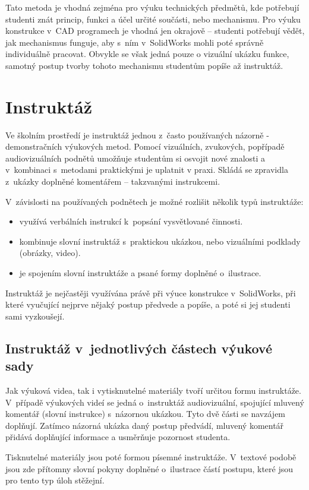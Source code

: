 Tato metoda je vhodná zejména pro výuku technických předmětů, kde potřebují studenti znát princip, funkci a účel určité součásti, nebo mechanismu. 
Pro výuku konstrukce v~CAD programech je vhodná jen okrajově -- studenti potřebují vědět, jak mechanismus funguje, aby s~ním v~SolidWorks mohli poté správně individuálně pracovat.
Obvykle se však jedná pouze o vizuální ukázku funkce, samotný postup tvorby tohoto mechanismu studentům popíše až instruktáž.

\section{Instruktáž}
Ve školním prostředí je instruktáž jednou z~často používaných názorně - demonstračních výukových metod.
Pomocí vizuálních, zvukových, popřípadě audiovizuálních podnětů umožňuje studentům si osvojit nové znalosti a v~kombinaci s~metodami praktickými je uplatnit v praxi.
Skládá se zpravidla z~ukázky doplněné komentářem -- takzvanými instrukcemi.

\noindent V~závislosti na používaných podnětech je možné rozlišit několik typů instruktáže:
\begin{itemize}[topsep=0pt]
    \setlength\itemsep{0em}
    \item {} využívá verbálních instrukcí k~popsání vysvětlované činnosti.
    \item {} kombinuje slovní instruktáž s~praktickou ukázkou, nebo vizuálními podklady (obrázky, video).
    \item {} je spojením slovní instruktáže a psané formy doplněné o~ilustrace.
\end{itemize}

Instruktáž je nejčastěji využívána právě při výuce konstrukce v~SolidWorks, při které vyučující nejprve nějaký postup předvede a popíše, a poté si jej studenti sami vyzkoušejí.

\subsection{Instruktáž v~jednotlivých částech výukové sady}
\B{\textcolor{red}{PŠ: V úvodu dopíšu, že vytvářím výukovou sadu a z čeho se skládá.}} \newline
Jak výuková videa, tak i vytisknutelné materiály tvoří určitou formu instruktáže.
V~případě výukových videí se jedná o~instruktáž audiovizuální, spojující mluvený komentář (slovní instrukce) s~názornou ukázkou.
Tyto dvě části se navzájem doplňují.
Zatímco názorná ukázka daný postup předvádí, mluvený komentář přidává doplňující informace a usměrňuje pozornost studenta.

Tisknutelné materiály jsou poté formou písemné instruktáže.
V~textové podobě jsou zde přítomny slovní pokyny doplněné o~ilustrace částí postupu, které jsou pro tento typ úloh stěžejní.

\newpage
